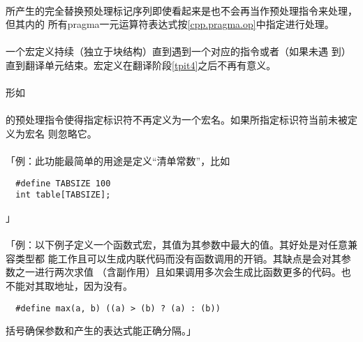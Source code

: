\paragraph{}
所产生的完全替换预处理标记序列即使看起来是也不会再当作预处理指令来处理，但其内的
所有pragma一元运算符表达式按\ref{cpp.pragma.op}中指定进行处理。

\paragraph{}
一个宏定义持续（独立于块结构）直到遇到一个对应的指令或者（如果未遇
到）直到翻译单元结束。宏定义在翻译阶段\ref{tpit4}之后不再有意义。

\paragraph{}
形如                                                                          \\
\mbox{}                         \\
的预处理指令使得指定标识符不再定义为一个宏名。如果所指定标识符当前未被定义为宏名
则忽略它。

\paragraph{}
「例：此功能最简单的用途是定义``清单常数''，比如
\begin{lstlisting}
  #define TABSIZE 100
  int table[TABSIZE];
\end{lstlisting}」

\paragraph{}
「例：以下例子定义一个函数式宏，其值为其参数中最大的值。其好处是对任意兼容类型都
能工作且可以生成内联代码而没有函数调用的开销。其缺点是会对其参数之一进行两次求值
（含副作用）且如果调用多次会生成比函数更多的代码。也不能对其取地址，因为没有。
\begin{lstlisting}
  #define max(a, b) ((a) > (b) ? (a) : (b))
\end{lstlisting}
括号确保参数和产生的表达式能正确分隔。」


